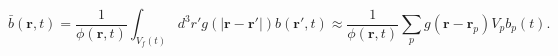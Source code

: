 \begin{equation}
\bar{b}(\mathbf{r},t) = \frac{1}{\phi(\mathbf{r},t)} \int_{V_f(t)}{d^3 r'
g(|\mathbf{r} - \mathbf{r'}|) b(\mathbf{r'},t)}
\approx
\frac{1}{\phi(\mathbf{r},t)} \sum_{p}{g(\mathbf{r} - \mathbf{r}_p)
V_p b_p(t)}.
 \label{eq:b}
\end{equation}
